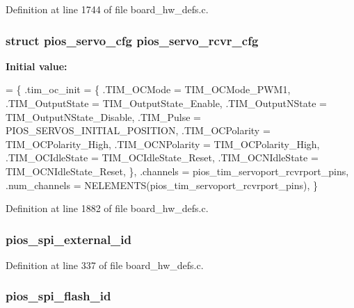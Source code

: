 Definition at line 1744 of file board\-\_\-hw\-\_\-defs.\-c.

\hypertarget{group___tau_labs_core_gaa111328ef9a12c806ed1c24b93d4f663}{
\subsubsection[{pios\-\_\-servo\-\_\-rcvr\-\_\-cfg}]{\setlength{\rightskip}{0pt plus 5cm}struct {\bf pios\-\_\-servo\-\_\-cfg} pios\-\_\-servo\-\_\-rcvr\-\_\-cfg}}\label{group___tau_labs_core_gaa111328ef9a12c806ed1c24b93d4f663}
{\bfseries Initial value\-:}
\begin{DoxyCode}
= \{
        .tim\_oc\_init = \{
                .TIM\_OCMode = TIM\_OCMode\_PWM1,
                .TIM\_OutputState = TIM\_OutputState\_Enable,
                .TIM\_OutputNState = TIM\_OutputNState\_Disable,
                .TIM\_Pulse = PIOS\_SERVOS\_INITIAL\_POSITION,
                .TIM\_OCPolarity = TIM\_OCPolarity\_High,
                .TIM\_OCNPolarity = TIM\_OCPolarity\_High,
                .TIM\_OCIdleState = TIM\_OCIdleState\_Reset,
                .TIM\_OCNIdleState = TIM\_OCNIdleState\_Reset,
        \},
        .channels = pios\_tim\_servoport\_rcvrport\_pins,
        .num\_channels = NELEMENTS(pios\_tim\_servoport\_rcvrport\_pins),
\}
\end{DoxyCode}


Definition at line 1882 of file board\-\_\-hw\-\_\-defs.\-c.

\hypertarget{group___tau_labs_core_gabe70a8116c4e52c82ce8151bf5d64dec}{
\subsubsection[{pios\-\_\-spi\-\_\-external\-\_\-id}]{ pios\-\_\-spi\-\_\-external\-\_\-id}}\label{group___tau_labs_core_gabe70a8116c4e52c82ce8151bf5d64dec}


Definition at line 337 of file board\-\_\-hw\-\_\-defs.\-c.

\hypertarget{group___tau_labs_core_gaebc54f2c5fc298fad979df4d9bd1414b}{
\subsubsection[{pios\-\_\-spi\-\_\-flash\-\_\-id}]{ pios\-\_\-spi\-\_\-flash\-\_\-id}}\label{group___tau_labs_core_gaebc54f2c5fc298fad979df4d9bd1414b}


